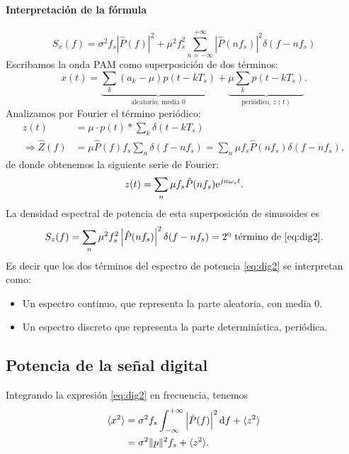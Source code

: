 \paragraph{Interpretación de la fórmula}

\begin{equation}
    \label{eq:dig2}S_x(f) = \sigma^2 f_s \left|\hat{P}(f)\right|^2 + \mu^2 f_s^2 \sum_{n=-\infty}^{+\infty} \left|\hat{P}(nf_s)\right|^2\delta(f-nf_s)\tag{\textasteriskcentered}
\end{equation}
Escribamos la onda PAM como superposición de dos términos:
\[x(t)= \underbrace{\sum_k (a_k-\mu) p(t-kT_s)}_{\text{aleatorio, media $0$}} +  \underbrace{\mu\sum_k p(t-kT_s)}_{\text{periódico, $z(t)$}}.\]
Analizamos por Fourier el término periódico:
\begin{align*}
    z(t) & = \mu \cdot p(t) \ast \sum_k \delta(t-kT_s)  \\
    \Rightarrow \hat{Z}(f)  & = \mu \hat{P}(f) f_s \sum_n \delta(f-nf_s) = \sum_n \mu f_s \hat{P}(nf_s) \delta(f-nf_s),
\end{align*}
de donde obtenemos la siguiente serie de Fourier:
\begin{align*}%
z(t) = \sum_n \mu f_s \hat{P}(nf_s)\e^{jn\omega_s t}.
\end{align*}
La densidad espectral de potencia de esta superposición de sinusoides es
\[S_z(f) = \sum_n \mu^2 f_s^2\left|\hat{P}(nf_s)\right|^2 \delta(f-nf_s) = \text{2º término de \eqref{eq:dig2}}.\]
Es decir que los dos términos del espectro de potencia  \eqref{eq:dig2} se interpretan como:
\begin{itemize}
    \item Un espectro continuo, que representa la parte aleatoria, con media $0$.
    \item Un espectro discreto que representa la parte determinística, periódica.
\end{itemize}


\newpage

\subsection*{Potencia de la señal digital}

Integrando la expresión \eqref{eq:dig2} en frecuencia, tenemos
\begin{align*} \langle x^2 \rangle &= \sigma^2
f_s\displaystyle\int_{-\infty}^{+\infty}\left|\hat{P}(f)\right|^2\mathrm{d}
f + \langle z^2\rangle \\
& = \sigma^2 \|p\|^2 f_s +\langle z^2\rangle.
\end{align*}

